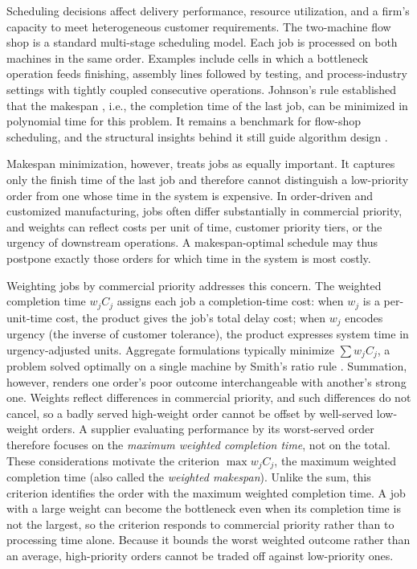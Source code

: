 \documentclass[12pt]{article} \textheight=24.5cm \textwidth=16.5cm \parskip = 0.165cm
\begin{document}
\begin{sloppypar}
        Scheduling decisions affect delivery performance, resource utilization, and a firm's capacity to meet heterogeneous customer requirements. The two-machine flow shop is a standard multi-stage scheduling model. Each job is processed on both machines in the same order. Examples include cells in which a bottleneck operation feeds finishing, assembly lines followed by testing, and process-industry settings with tightly coupled consecutive operations. Johnson’s rule \citep{Johnson1954NRL} established that the makespan , i.e., the completion time of the last job, can be minimized in polynomial time for this problem. It remains a benchmark for flow-shop scheduling, and the structural insights behind it still guide algorithm design \citep{AgnetisBillautPinedoShabtay2025EJOR}.
        
        Makespan minimization, however, treats jobs as equally important. It captures only the finish time of the last job and therefore cannot distinguish a low-priority order from one whose time in the system is expensive. In         order-driven and customized manufacturing, jobs often differ substantially in commercial priority, and weights can reflect costs per unit of time, customer priority tiers, or the urgency of downstream operations. A makespan-optimal
        schedule may thus postpone exactly those orders for which time in the system is most costly.
        
        Weighting jobs by commercial priority addresses this concern. The weighted completion time $w_jC_j$ assigns each job a completion-time cost: when $w_j$ is a per-unit-time cost, the product gives the job's total delay cost; when $w_j$
        encodes urgency (the inverse of customer tolerance), the product expresses system time in urgency-adjusted units. Aggregate formulations typically minimize $\sum w_jC_j$, a problem solved optimally on a single machine by Smith's ratio rule \citep{Smith1956NRL}. Summation, however, renders one order's poor outcome interchangeable with another's strong one. Weights reflect differences in commercial priority, and such differences do not cancel, so a badly served
        high-weight order cannot be offset by well-served low-weight orders. A supplier evaluating performance by its worst-served order therefore focuses on the \emph{maximum weighted completion time}, not on the total. These considerations motivate the criterion $\max w_jC_j$, the maximum weighted completion time (also called the
        \emph{weighted makespan}). Unlike the sum, this criterion identifies the order with the maximum weighted completion time. A job with a large weight can become the bottleneck even when its completion time is not the largest, so the criterion responds to commercial priority rather than to processing time alone. Because it bounds the worst weighted outcome rather than an average, high-priority orders cannot be traded off against low-priority ones.
        

\end{sloppypar}
\end{document}
